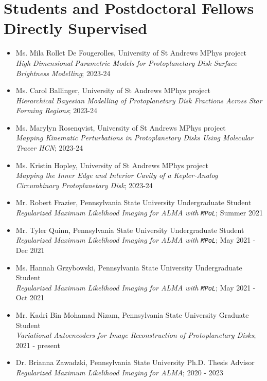\section*{Students and Postdoctoral Fellows Directly Supervised}
\begin{itemize}
  \item Ms. Mila Rollet De Fougerolles, University of St Andrews MPhys project \\
  \emph{High Dimensional Parametric Models for Protoplanetary Disk Surface Brightness Modelling}; 2023-24
  \item Ms. Carol Ballinger, University of St Andrews MPhys project \\
  \emph{Hierarchical Bayesian Modelling of Protoplanetary Disk Fractions Across Star Forming Regions}; 2023-24
  \item Ms. Marylyn Rosenqvist, University of St Andrews MPhys project \\
  \emph{Mapping Kinematic Perturbations in Protoplanetary Disks Using Molecular Tracer HCN}; 2023-24
  \item Ms. Kristin Hopley, University of St Andrews MPhys project \\
  \emph{Mapping the Inner Edge and Interior Cavity of a Kepler-Analog Circumbinary Protoplanetary
  Disk}; 2023-24
  \item Mr. Robert Frazier, Pennsylvania State University Undergraduate Student \\ 
  \emph{Regularized Maximum Likelihood Imaging for ALMA with \texttt{MPoL}}; Summer 2021
  \item Mr. Tyler Quinn, Pennsylvania State University Undergraduate Student \\ 
  \emph{Regularized Maximum Likelihood Imaging for ALMA with \texttt{MPoL}}; May 2021 - Dec 2021
  \item Ms. Hannah Grzybowski, Pennsylvania State University Undergraduate Student \\ 
  \emph{Regularized Maximum Likelihood Imaging for ALMA with \texttt{MPoL}}; May 2021 - Oct 2021
  \item Mr. Kadri Bin Mohamad Nizam, Pennsylvania State University Graduate Student \\ 
  \emph{Variational Autoencoders for Image Reconstruction of Protoplanetary Disks}; 2021 - present
  \item Dr. Brianna Zawadzki, Pennsylvania State University Ph.D. Thesis Advisor \\
  \emph{Regularized Maximum Likelihood Imaging for ALMA}; 2020 - 2023

\end{itemize}
